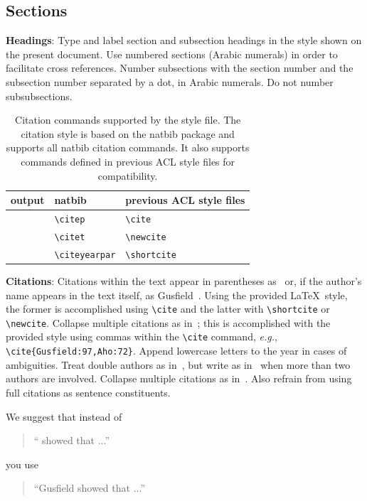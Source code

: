 \documentclass[11pt,a4paper]{article}
\begin{document}
\subsection{Sections}

\textbf{Headings}: Type and label section and subsection headings in the
style shown on the present document.  Use numbered sections (Arabic
numerals) in order to facilitate cross references. Number subsections
with the section number and the subsection number separated by a dot,
in Arabic numerals.
Do not number subsubsections.

\begin{table}[t!]
\centering
\begin{tabular}{lll}
  output & natbib & previous ACL style files\\
  \hline
  \citep{Gusfield:97} & \verb|\citep| & \verb|\cite| \\
  \citet{Gusfield:97} & \verb|\citet| & \verb|\newcite| \\
  \citeyearpar{Gusfield:97} & \verb|\citeyearpar| & \verb|\shortcite| \\
\end{tabular}
\caption{Citation commands supported by the style file.
  The citation style is based on the natbib package and
  supports all natbib citation commands.
  It also supports commands defined in previous ACL style files
  for compatibility.
  }
\end{table}

\textbf{Citations}: Citations within the text appear in parentheses
as~\cite{Gusfield:97} or, if the author's name appears in the text
itself, as Gusfield~.
Using the provided \LaTeX\ style, the former is accomplished using
{\small\verb|\cite|} and the latter with {\small\verb|\shortcite|} or {\small\verb|\newcite|}. Collapse multiple citations as in~\cite{Gusfield:97,Aho:72}; this is accomplished with the provided style using commas within the {\small\verb|\cite|} command, \emph{e.g.}, {\small\verb|\cite{Gusfield:97,Aho:72}|}. Append lowercase letters to the year in cases of ambiguities.  
 Treat double authors as
in~\cite{Aho:72}, but write as in~\cite{Chandra:81} when more than two
authors are involved. Collapse multiple citations as
in~\cite{Gusfield:97,Aho:72}. Also refrain from using full citations
as sentence constituents.

We suggest that instead of
\begin{quote}
  ``\cite{Gusfield:97} showed that ...''
\end{quote}
you use
\begin{quote}
``Gusfield    showed that ...''
\end{quote}
\end{document}
